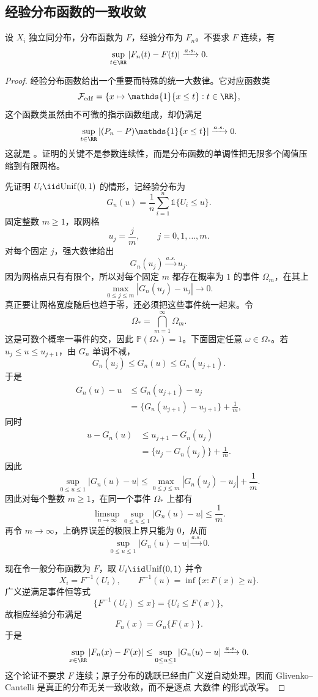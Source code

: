 \subsection{经验分布函数的一致收敛}
\begin{theorem}
设 $X_i$ 独立同分布，分布函数为 $F$，经验分布为 $F_n$。不要求 $F$ 连续，有
\[
 \sup_{t\in\RR}|F_n(t)-F(t)|\xrightarrow{a.s.}0.
\]
\end{theorem}
\begin{proof}
经验分布函数给出一个重要而特殊的统一大数律。它对应函数类
\[
 \mathcal F_{\rm cdf}
 =\{x\mapsto\mathds{1}\{x\le t\}:t\in\RR\},
\]
这个函数类虽然由不可微的指示函数组成，却仍满足
\[
 \sup_{t\in\RR}|(P_n-P)\mathds{1}\{x\le t\}|\xrightarrow{a.s.}0.
\]
这就是 。证明的关键不是参数连续性，而是分布函数的单调性把无限多个阈值压缩到有限网格。

先证明 $U_i\iid\mathrm{Unif}(0,1)$ 的情形，记经验分布为
\[
 G_n(u)=\frac1n\sum_{i=1}^n\mathds{1}\{U_i\le u\}.
\]
固定整数 $m\ge1$，取网格
\[
 u_j=\frac jm,
 \qquad j=0,1,\ldots,m.
\]
对每个固定 $j$，强大数律给出
\[
 G_n(u_j)\xrightarrow{a.s.} u_j.
\]
因为网格点只有有限个，所以对每个固定 $m$ 都存在概率为 $1$ 的事件 $\Omega_m$，在其上
\[
 \max_{0\le j\le m}|G_n(u_j)-u_j|\to0.
\]
真正要让网格宽度随后也趋于零，还必须把这些事件统一起来。令
\[
 \Omega_*=\bigcap_{m=1}^{\infty}\Omega_m.
\]
这是可数个概率一事件的交，因此 $\mathbb P(\Omega_*)=1$。下面固定任意 $\omega\in\Omega_*$。若 $u_j\le u\le u_{j+1}$，由 $G_n$ 单调不减，
\[
 G_n(u_j)\le G_n(u)\le G_n(u_{j+1}).
\]
于是
\begin{align*}
 G_n(u)-u
 &\le G_n(u_{j+1})-u_j
 \\&=\{G_n(u_{j+1})-u_{j+1}\}+\frac1m,
\end{align*}
同时
\begin{align*}
 u-G_n(u)
 &\le u_{j+1}-G_n(u_j)
 \\&=\{u_j-G_n(u_j)\}+\frac1m.
\end{align*}
因此
\[
 \sup_{0\le u\le1}|G_n(u)-u|
 \le
 \max_{0\le j\le m}|G_n(u_j)-u_j|+\frac1m.
\]
因此对每个整数 $m\ge1$，在同一个事件 $\Omega_*$ 上都有
\[
 \limsup_{n\to\infty}
 \sup_{0\le u\le1}|G_n(u)-u|
 \le\frac1m.
\]
再令 $m\to\infty$，上确界误差的极限上界只能为 $0$，从而
\[
 \sup_{0\le u\le1}|G_n(u)-u|\xrightarrow{a.s.}0.
\]

现在令一般分布函数为 $F$，取 $U_i\iid\mathrm{Unif}(0,1)$ 并令
\[
 X_i=F^{-1}(U_i),
 \qquad
 F^{-1}(u)=\inf\{x:F(x)\ge u\}.
\]
广义逆满足事件恒等式
\[
 \{F^{-1}(U_i)\le x\}
 =\{U_i\le F(x)\},
\]
故相应经验分布满足
\[
 F_n(x)=G_n\{F(x)\}.
\]
于是
\[
 \sup_{x\in\RR}|F_n(x)-F(x)|
 \le
 \sup_{0\le u\le1}|G_n(u)-u|
 \xrightarrow{a.s.}0.
\]
这个论证不要求 $F$ 连续；原子分布的跳跃已经由广义逆自动处理。因而 Glivenko--Cantelli 是真正的分布无关一致收敛，而不是逐点 大数律 的形式改写。

\end{proof}

